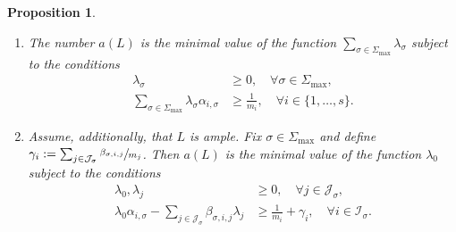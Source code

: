 \documentclass[JEP,XML,SOM,Unicode,published]{cedram}
\newenvironment{enumeratei}
{\bgroup\def\theenumi{\roman{enumi}}\def\theenumii{\arabic{enumii}}\begin{enumerate}}
{\end{enumerate}\egroup}
\newcommand{\ii}[1]{\mathcal{J}_{#1}}
\newcommand{\ic}[1]{\mathcal{I}_{#1}}
\newtheorem{proposition}[theorem]{Proposition}
\theoremstyle{definition}
\numberwithin{theorem}{section}
\begin{document}
\skpt
\begin{proposition}
\label{prop:description_a}
\begin{enumeratei}
\item
\label{item:global_a}
The number $a(L)$ is the minimal value of the function
$\sum_{\sigma\in\Sigma_{\max}}\lambda_\sigma$ subject to the conditions
\begin{align}
\label{eq:item:global_a_condition_variables}
\lambda_{\sigma}&\geq0,\quad\forall \sigma\in\Sigma_{\max},\\
\label{eq:item:global_a_condition_effective}
\sum_{\sigma\in\Sigma_{\max}}\lambda_\sigma \alpha_{i,\sigma}
&\geq \frac 1{m_i}, \quad \forall i\in\{1,\dots,s\}.
\end{align}
\item
\label{item:local_a}
Assume, additionally, that $L$ is ample. Fix $\sigma\in\Sigma_{\max}$ and
define $\gamma_i:=\sum_{j\in\ii{\sigma}}\sfrac {\beta_{\sigma,i,j}}{m_j}$.
Then $a(L)$ is the minimal value of the function $\lambda_0$ subject to the conditions
\begin{align}
\label{eq:item:local_a_condition_variables}
\lambda_0, \lambda_j&\geq0, \quad\forall j\in\ii{\sigma},\\
\label{eq:item:local_a_condition_effective}
\lambda_0 \alpha_{i,\sigma} -\sum_{j\in \ii{\sigma}}\beta_{\sigma,i,j}\lambda_j
&\geq \frac 1{m_i}+\gamma_i, \quad \forall i\in\ic{\sigma}.
\end{align}
\end{enumeratei}
\end{proposition}
\end{document}
